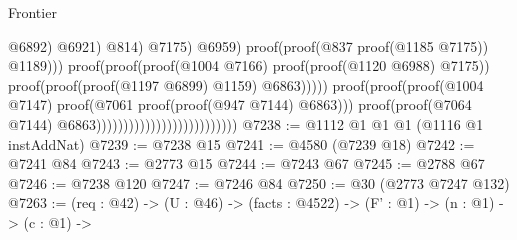 \begin{lexlean}{Frontier}
\begin{coremodule}
                                                                                          @6892)
                                                                                        @6921)
                                                                                      @814)
                                                                                    @7175)
                                                                                  @6959)
                                                                                proof(proof(@837
                                                                                      proof(@1185
                                                                                          @7175))
                                                                                    @1189)))
                                                                          proof(proof(proof(@1004
                                                                                  @7166)
                                                                                proof(proof(@1120
                                                                                      @6988)
                                                                                    @7175))
                                                                              proof(proof(proof(@1197
                                                                                      @6899)
                                                                                    @1159)
                                                                                  @6863)))))
                                                                proof(proof(proof(@1004 @7147)
                                                                      proof(@7061
                                                                          proof(proof(@947 @7144)
                                                                              @6863)))
                                                                    proof(proof(@7064 @7144)
                                                                        @6863))))))))))))))))))))))))))
@7238 := @1112 @1 @1 @1 (@1116 @1 instAddNat)
@7239 := @7238 @15
@7241 := @4580 (@7239 @18)
@7242 := @7241 @84
@7243 := @2773 @15
@7244 := @7243 @67
@7245 := @2788 @67
@7246 := @7238 @120
@7247 := @7246 @84
@7250 := @30 (@2773 @7247 @132)
@7263 := (req : @42) ->
  (U : @46) ->
  (facts : @4522) ->
  (F' : @1) ->
  (n : @1) ->
  (c : @1) ->

\end{coremodule}
\end{lexlean}

